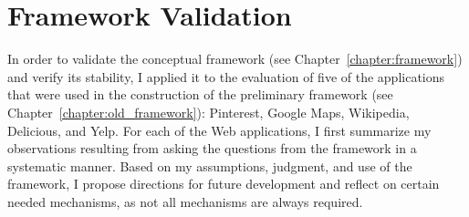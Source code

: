 \chapter{Framework Validation}
\label{chapter:evaluation}

In order to validate the conceptual framework (see Chapter~\ref{chapter:framework}) and verify its stability, I applied it to the evaluation of five of the applications that were used in the construction of the preliminary framework (see Chapter~\ref{chapter:old_framework}): Pinterest, Google Maps, Wikipedia, Delicious, and Yelp. For each of the Web applications, I first summarize my observations resulting from asking the questions from the framework in a systematic manner. Based on my assumptions, judgment, and use of the framework, I propose directions for future development and reflect on certain needed mechanisms, as not all mechanisms are always required.  

